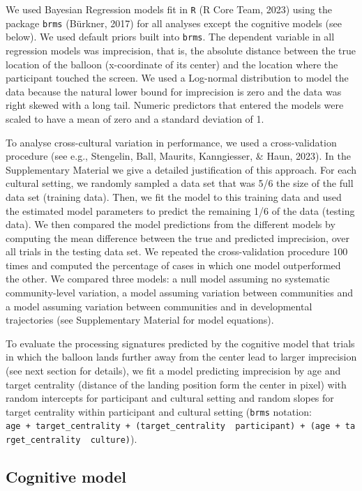 \documentclass[
  man,floatsintext]{apa6}
\begin{document}
We used Bayesian Regression models fit in \texttt{R} (R Core Team, 2023) using the package \texttt{brms} (Bürkner, 2017) for all analyses except the cognitive models (see below). We used default priors built into \texttt{brms}. The dependent variable in all regression models was imprecision, that is, the absolute distance between the true location of the balloon (x-coordinate of its center) and the location where the participant touched the screen. We used a Log-normal distribution to model the data because the natural lower bound for imprecision is zero and the data was right skewed with a long tail. Numeric predictors that entered the models were scaled to have a mean of zero and a standard deviation of 1.

To analyse cross-cultural variation in performance, we used a cross-validation procedure (see e.g., Stengelin, Ball, Maurits, Kanngiesser, \& Haun, 2023). In the Supplementary Material we give a detailed justification of this approach. For each cultural setting, we randomly sampled a data set that was 5/6 the size of the full data set (training data). Then, we fit the model to this training data and used the estimated model parameters to predict the remaining 1/6 of the data (testing data). We then compared the model predictions from the different models by computing the mean difference between the true and predicted imprecision, over all trials in the testing data set. We repeated the cross-validation procedure 100 times and computed the percentage of cases in which one model outperformed the other. We compared three models: a null model assuming no systematic community-level variation, a model assuming variation between communities and a model assuming variation between communities and in developmental trajectories (see Supplementary Material for model equations).

To evaluate the processing signatures predicted by the cognitive model that trials in which the balloon lands further away from the center lead to larger imprecision (see next section for details), we fit a model predicting imprecision by age and target centrality (distance of the landing position form the center in pixel) with random intercepts for participant and cultural setting and random slopes for target centrality within participant and cultural setting (\texttt{brms} notation: \texttt{age\ +\ target\_centrality\ +\ (target\_centrality\ \textbar{}\ participant)\ +\ (age\ +\ target\_centrality\ \textbar{}\ culture)}).

\hypertarget{cognitive-model}{%
\subsection{Cognitive model}\label{cognitive-model}}
\end{document}
